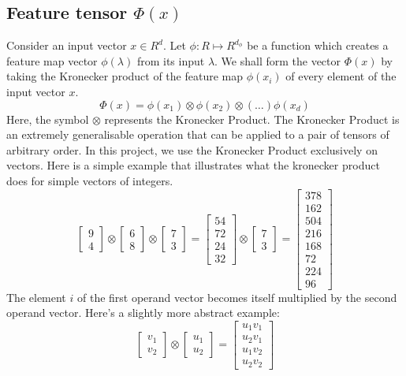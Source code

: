 \documentclass{article}
\theoremstyle{definition}
\theoremstyle{definition}
\begin{document}
\subsection{Feature tensor $\Phi(x)$}
Consider an input vector $x \in R^d$. Let $\phi : R \mapsto R^{d_{\phi}}$ be a function which creates a feature map vector $\phi(\lambda)$ from its input $\lambda$.  We shall form the vector $\Phi(x)$ by taking the Kronecker product of the feature map $\phi(x_i)$ of every element of the input vector $x$.
\begin{equation}
    \Phi(x) = \phi(x_1) \otimes  \phi(x_2) 
                \otimes (\dots) \phi(x_d)
\end{equation}
Here, the symbol $\otimes$ represents the Kronecker Product. The Kronecker Product is an extremely generalisable operation that can be applied to a pair of tensors of arbitrary order. In this project, we use the Kronecker Product exclusively on vectors. Here is a simple example that illustrates what the kronecker product does for simple vectors of integers.
\[
\begin{bmatrix}
    9 \\ 4
\end{bmatrix}
\otimes
\begin{bmatrix}
    6 \\ 8
\end{bmatrix}
\otimes
\begin{bmatrix}
    7 \\ 3
\end{bmatrix}
=
\begin{bmatrix}
    54 \\ 72 \\ 24 \\ 32
\end{bmatrix}
\otimes
\begin{bmatrix}
    7 \\ 3
\end{bmatrix}
=
\begin{bmatrix}
    378 \\ 162\\ 504 \\216\\ 168\\ 72\\ 224\\ 96
\end{bmatrix}
\]
The element $i$ of the first operand vector becomes itself multiplied by the second operand vector. Here's a slightly more abstract example:
\[
    \begin{bmatrix}
        v_1 \\ v_2
    \end{bmatrix}
    \otimes
    \begin{bmatrix}
        u_1 \\ u_2
    \end{bmatrix}
    =
    \begin{bmatrix}
        u_1 v_1 \\ u_2 v_1 \\ u_1v_2 \\ u_2v_2
    \end{bmatrix}
\]
\end{document}
